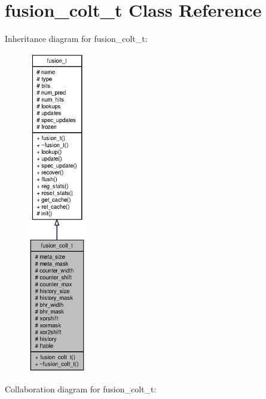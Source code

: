 \section{fusion\_\-colt\_\-t Class Reference}
\label{classfusion__colt__t}
Inheritance diagram for fusion\_\-colt\_\-t:\nopagebreak
\begin{figure}[H]
\begin{center}
\leavevmode
\includegraphics[height=400pt]{classfusion__colt__t__inherit__graph}
\end{center}
\end{figure}
Collaboration diagram for fusion\_\-colt\_\-t:\nopagebreak
